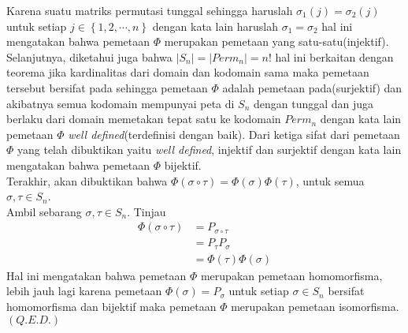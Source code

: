 \documentclass[11pt,a4paper]{article}
\theoremstyle{plain}
\theoremstyle{definition}
\theoremstyle{remark}
\begin{document}
\begin{enumerate}
\begin{enumerate}
\begin{center}
\begin{tabular}{llll}
	\end{tabular}
	\end{center}
	Karena suatu matriks permutasi tunggal sehingga haruslah $\sigma_{1}(j)=\sigma_{2}(j)$ untuk setiap $j\in \left\{ 1,2,\cdots,n \right\}$ dengan kata lain haruslah $\sigma_{1}=\sigma_{2}$ hal ini mengatakan bahwa pemetaan $\Phi$ merupakan pemetaan yang satu-satu(injektif).\\
	\hspace*{0.5cm} Selanjutnya, diketahui juga bahwa $\left| S_{n}\right|=\left|Perm_{n}\right|=n!$ hal ini berkaitan dengan teorema jika kardinalitas dari domain dan kodomain sama maka pemetaan tersebut bersifat pada sehingga pemetaan $\Phi$ adalah pemetaan pada(surjektif) dan akibatnya semua kodomain mempunyai peta di $S_{n}$ dengan tunggal dan juga berlaku dari domain memetakan tepat satu ke kodomain $Perm_{n}$ dengan kata lain pemetaan $\Phi$ \textit{well defined}(terdefinisi dengan baik). Dari ketiga sifat dari pemetaan $\Phi$ yang telah dibuktikan yaitu \textit{well defined}, injektif dan surjektif dengan kata lain mengatakan bahwa pemetaan $\Phi$ bijektif.\\
	\hspace*{0.5cm} Terakhir, akan dibuktikan bahwa $\Phi(\sigma \circ \tau)=\Phi(\sigma)\Phi(\tau)$, untuk semua $\sigma, \tau\in S_{n}$.\\
	Ambil sebarang $\sigma, \tau\in S_{n}$. Tinjau
	\begin{align*}
	\Phi(\sigma \circ \tau) &= P_{\sigma \circ \tau} \\
	&= P_{\tau}P_{\sigma} \\
	&= \Phi(\tau)\Phi(\sigma)
	\end{align*}
	Hal ini mengatakan bahwa pemetaan $\Phi$ merupakan pemetaan homomorfisma, lebih jauh lagi karena pemetaan $\Phi(\sigma)=P_{\sigma}$ untuk setiap $\sigma\in S_{n}$ bersifat homomorfisma dan bijektif maka pemetaan $\Phi$ merupakan pemetaan isomorfisma. $(Q.E.D.)$
	

\end{enumerate}
\end{enumerate}
\end{document}
